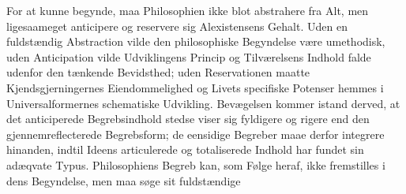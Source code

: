 \documentclass[12pt]{book}
\newcommand{\anm}[1]{\emph{\textbf{Anm.~#1.}}}
\newcommand{\opage}[1]{\marginnote{\footnotesize\textit{[#1]}}}
\begin{document}
\noindent For at kunne begynde, maa Philosophien ikke blot abstrahere fra Alt, men ligesaameget
anticipere og reservere sig Alexistensens Gehalt. Uden en fuldstændig Abstraction vilde den
philosophiske Begyndelse være umethodisk, uden Anticipation vilde Udviklingens Princip og
Tilværelsens Indhold falde udenfor den tænkende Bevidsthed; uden Reservationen maatte
Kjendsgjerningernes Eiendommelighed og Livets specifiske Potenser hemmes i Universalformernes
schematiske Udvikling. Bevægelsen kommer istand derved, at det anticiperede Begrebsindhold
stedse viser sig fyldigere og rigere end den gjennemreflecterede Begrebsform; de eensidige
Begreber maae derfor integrere hinanden, indtil Ideens articulerede og totaliserede Indhold har
fundet sin adæqvate Typus. Philosophiens Begreb kan, som Følge heraf, ikke fremstilles i dens
Begyndelse, men maa søge sit fuldstændige
\opage{98} %
\end{document}
